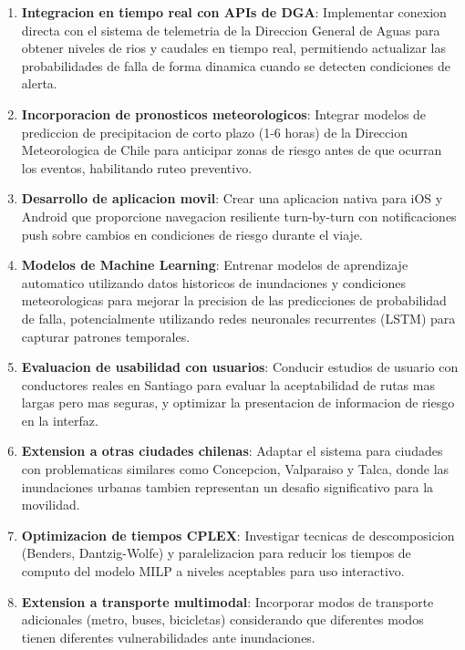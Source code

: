 \documentclass[conference]{IEEEtran}
\begin{document}
\begin{enumerate}
    \item \textbf{Integracion en tiempo real con APIs de DGA}: Implementar conexion directa con el sistema de telemetria de la Direccion General de Aguas para obtener niveles de rios y caudales en tiempo real, permitiendo actualizar las probabilidades de falla de forma dinamica cuando se detecten condiciones de alerta.

    \item \textbf{Incorporacion de pronosticos meteorologicos}: Integrar modelos de prediccion de precipitacion de corto plazo (1-6 horas) de la Direccion Meteorologica de Chile para anticipar zonas de riesgo antes de que ocurran los eventos, habilitando ruteo preventivo.

    \item \textbf{Desarrollo de aplicacion movil}: Crear una aplicacion nativa para iOS y Android que proporcione navegacion resiliente turn-by-turn con notificaciones push sobre cambios en condiciones de riesgo durante el viaje.

    \item \textbf{Modelos de Machine Learning}: Entrenar modelos de aprendizaje automatico utilizando datos historicos de inundaciones y condiciones meteorologicas para mejorar la precision de las predicciones de probabilidad de falla, potencialmente utilizando redes neuronales recurrentes (LSTM) para capturar patrones temporales.

    \item \textbf{Evaluacion de usabilidad con usuarios}: Conducir estudios de usuario con conductores reales en Santiago para evaluar la aceptabilidad de rutas mas largas pero mas seguras, y optimizar la presentacion de informacion de riesgo en la interfaz.

    \item \textbf{Extension a otras ciudades chilenas}: Adaptar el sistema para ciudades con problematicas similares como Concepcion, Valparaiso y Talca, donde las inundaciones urbanas tambien representan un desafio significativo para la movilidad.

    \item \textbf{Optimizacion de tiempos CPLEX}: Investigar tecnicas de descomposicion (Benders, Dantzig-Wolfe) y paralelizacion para reducir los tiempos de computo del modelo MILP a niveles aceptables para uso interactivo.

    \item \textbf{Extension a transporte multimodal}: Incorporar modos de transporte adicionales (metro, buses, bicicletas) considerando que diferentes modos tienen diferentes vulnerabilidades ante inundaciones.
\end{enumerate}
\end{document}
